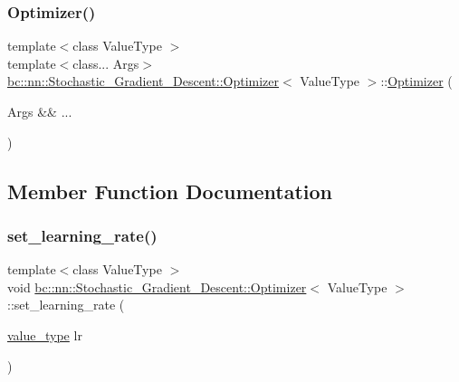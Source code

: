 \subsubsection{\texorpdfstring{Optimizer()}{Optimizer()}}
{\footnotesize\ttfamily template$<$class Value\+Type $>$ \\
template$<$class... Args$>$ \\
\hyperlink{structbc_1_1nn_1_1Stochastic__Gradient__Descent_1_1Optimizer}{bc\+::nn\+::\+Stochastic\+\_\+\+Gradient\+\_\+\+Descent\+::\+Optimizer}$<$ Value\+Type $>$\+::\hyperlink{structbc_1_1nn_1_1Stochastic__Gradient__Descent_1_1Optimizer}{Optimizer} (\begin{DoxyParamCaption}\item[{Args \&\&}]{... }\end{DoxyParamCaption})\hspace{0.3cm}{\ttfamily [inline]}}



\subsection{Member Function Documentation}
\mbox{\label{structbc_1_1nn_1_1Stochastic__Gradient__Descent_1_1Optimizer_a45fc8904b667c146a202c0a3ed1d5a09}} 
\subsubsection{\texorpdfstring{set\+\_\+learning\+\_\+rate()}{set\_learning\_rate()}}
{\footnotesize\ttfamily template$<$class Value\+Type $>$ \\
void \hyperlink{structbc_1_1nn_1_1Stochastic__Gradient__Descent_1_1Optimizer}{bc\+::nn\+::\+Stochastic\+\_\+\+Gradient\+\_\+\+Descent\+::\+Optimizer}$<$ Value\+Type $>$\+::set\+\_\+learning\+\_\+rate (\begin{DoxyParamCaption}\item[{\hyperlink{structbc_1_1nn_1_1Stochastic__Gradient__Descent_1_1Optimizer_a255321a50ffae76f028227a998915bc6}{value\+\_\+type}}]{lr }\end{DoxyParamCaption})\hspace{0.3cm}{\ttfamily [inline]}}

